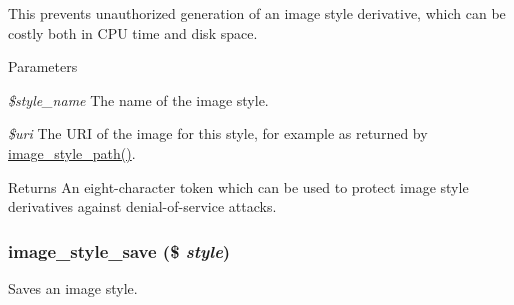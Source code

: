 This prevents unauthorized generation of an image style derivative, which can be costly both in CPU time and disk space.


\begin{DoxyParams}{Parameters}
\item[{\em \$style\_\-name}]The name of the image style. \item[{\em \$uri}]The URI of the image for this style, for example as returned by \hyperlink{image_8module_a993e0bcd2c632aa81deb0da7e3baa84c}{image\_\-style\_\-path()}.\end{DoxyParams}
\begin{DoxyReturn}{Returns}
An eight-\/character token which can be used to protect image style derivatives against denial-\/of-\/service attacks. 
\end{DoxyReturn}
\hypertarget{image_8module_a181d174a5071727c4d0f24103dfb2b9d}{
\subsubsection[{image\_\-style\_\-save}]{\setlength{\rightskip}{0pt plus 5cm}image\_\-style\_\-save (\$ {\em style})}}
\label{image_8module_a181d174a5071727c4d0f24103dfb2b9d}
Saves an image style.


